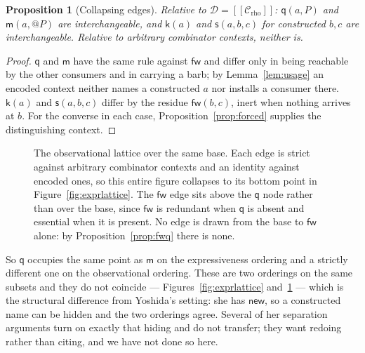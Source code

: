 \documentclass[11pt]{article}
\makeatletter
\theoremstyle{plain}
\newtheorem{proposition}[theorem]{Proposition}
\theoremstyle{definition}
\theoremstyle{remark}
\newcommand{\quo}[1]{@#1}
\newcommand{\enc}[1]{[\![#1]\!]}
\newcommand{\Ctx}{\mathscr{C}}
\newcommand{\Obs}{\mathcal{D}}
\newcommand{\mm}{\mathsf{m}}
\newcommand{\kk}{\mathsf{k}}
\newcommand{\fw}{\mathsf{fw}}
\newcommand{\sy}{\mathsf{s}}
\newcommand{\qq}{\mathsf{q}}
\makeatother
\begin{document}
\begin{proposition}[Collapsing edges]
\label{prop:collapse}
Relative to $\Obs = \enc{\Ctx_{\mathrm{rho}}}$: $\qq(a,P)$ and
$\mm(a,\quo{P})$ are interchangeable, and $\kk(a)$ and $\sy(a,b,c)$ for
constructed $b,c$ are interchangeable. Relative to arbitrary combinator
contexts, neither is.
\end{proposition}

\begin{proof}
$\qq$ and $\mm$ have the same rule against $\fw$ and differ only in being
reachable by the other consumers and in carrying a barb; by
Lemma~\ref{lem:usage} an encoded context neither names a constructed $a$ nor
installs a consumer there. $\kk(a)$ and $\sy(a,b,c)$ differ by the residue
$\fw(b,c)$, inert when nothing arrives at $b$. For the converse in each case,
Proposition~\ref{prop:forced} supplies the distinguishing context.
\end{proof}


\begin{figure}[t]
\centering
{}
\caption{The observational lattice over the same base. Each edge is strict
against arbitrary combinator contexts and an identity against encoded ones,
so this entire figure collapses to its bottom point in
Figure~\ref{fig:exprlattice}. The $\fw$ edge sits above the $\qq$ node rather
than over the base, since $\fw$ is redundant when $\qq$ is absent and
essential when it is present. No edge is drawn from the base to $\fw$ alone:
by Proposition~\ref{prop:fwq} there is none.}
\label{fig:obslattice}
\end{figure}

So $\qq$ occupies the same point as $\mm$ on the expressiveness ordering and
a strictly different one on the observational ordering. These are two
orderings on the same subsets and they do not coincide ---
Figures~\ref{fig:exprlattice} and~\ref{fig:obslattice} --- which is the
structural difference from Yoshida's setting: she has $\mathsf{new}$, so a
constructed name can be hidden and the two orderings agree. Several of her
separation arguments turn on exactly that hiding and do not transfer; they
want redoing rather than citing, and we have not done so here.
\end{document}
